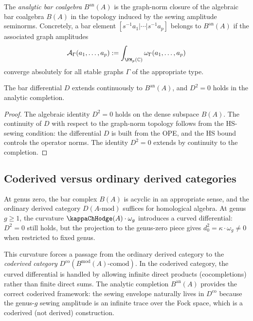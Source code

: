 \begin{definition}
The \emph{analytic bar coalgebra} $B^{\mathrm{an}}(A)$ is the
graph-norm closure of the algebraic bar coalgebra $B(A)$ in the
topology induced by the sewing amplitude seminorms. Concretely,
a bar element $[s^{-1}a_1|\cdots|s^{-1}a_p]$ belongs to
$B^{\mathrm{an}}(A)$ if the associated graph amplitudes
\[
\mathcal{A}_\Gamma(a_1,\dots,a_p)
:=
\int_{\FM_p(\mathbb{C})} \omega_\Gamma(a_1,\dots,a_p)
\]
converge absolutely for all stable graphs $\Gamma$ of the appropriate
type.
\end{definition}

\begin{proposition}[Analytic $D^2 = 0$; \ClaimStatusProvedHere]
The bar differential $D$ extends continuously to $B^{\mathrm{an}}(A)$,
and $D^2 = 0$ holds in the analytic completion.
\end{proposition}

\begin{proof}
The algebraic identity $D^2 = 0$ holds on the dense subspace $B(A)$.
The continuity of $D$ with respect to the graph-norm topology follows
from the HS-sewing condition: the differential $D$ is built from the
OPE, and the HS bound controls the operator norms. The identity
$D^2 = 0$ extends by continuity to the completion.
\end{proof}

\subsection{Coderived versus ordinary derived categories}

\begin{remark}
At genus zero, the bar complex $B(A)$ is acyclic in an appropriate sense,
and the ordinary derived category $D(A\text{-mod})$ suffices for
homological algebra. At genus $g \ge 1$, the curvature
$\kappaChHodge(A) \cdot \omega_g$ introduces a curved differential:
$D^2 = 0$ still holds, but the projection to the genus-zero piece
gives $d_0^2 = \kappa \cdot \omega_g \neq 0$ when restricted to
fixed genus.

This curvature forces a passage from the ordinary derived category to the
\emph{coderived category} $D^{\mathrm{co}}(B^{\mathrm{mod}}(A)\text{-comod})$.
In the coderived category, the curved differential is handled by allowing
infinite direct products (cocompletions) rather than finite direct sums.
The analytic completion $B^{\mathrm{an}}(A)$ provides the correct coderived
framework: the sewing envelope naturally lives in $D^{\mathrm{co}}$
because the genus-$g$ sewing amplitude is an infinite trace over the
Fock space, which is a coderived (not derived) construction.
\end{remark}

